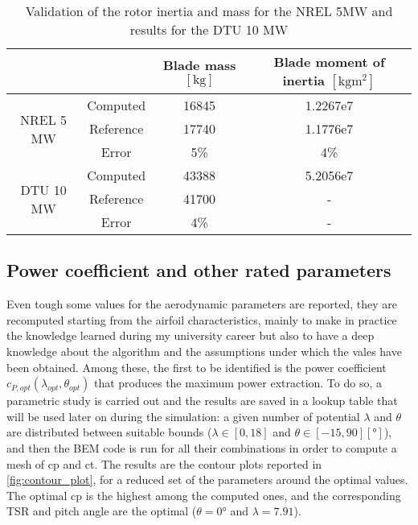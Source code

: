 \begin{table}[htb]
 \caption{Validation of the rotor inertia and mass for the NREL 5MW and results for the DTU 10 MW}
\centering
	\begin{tabular}{cccc}
		\toprule
    & & Blade mass $\left[\si{\kilo\gram}\right]$ & Blade moment of inertia $\left[\si{\kilo\gram\square\meter}\right]$\\ \midrule
    \multirow{3}{*}{NREL 5 MW}		     &  Computed 	& 16845	&  1.2267e7\\
      & Reference	\cite{NREL_5MW_reference} & 17740 &  1.1776e7\\ 
      & Error & 5\% &4\% \\ \midrule
    \multirow{3}{*}{DTU 10 MW}& Computed    &  43388 & 5.2056e7\\
& Reference \cite{review_of_scaling_low} & 41700 & -\\
& Error & 4\% & -  \\  
		\bottomrule
	\end{tabular}
 \label{tab:rotor_inertia}
\end{table}

\subsection{Power coefficient and other rated parameters}\label{subsec:lookup_cp}
Even tough some values for the aerodynamic parameters are reported, they are recomputed starting from the airfoil characteristics, mainly to make in practice the knowledge learned during my university career but also to have a deep knowledge about the algorithm and the assumptions under which the vales have been obtained. Among these, the first to be identified is the power coefficient $c_{P, opt}(\lambda_{opt}, \theta_{opt})$ that produces the maximum power extraction. To do so, a parametric study is carried out and the results are saved in a lookup table that will be used later on during the simulation: a given number of potential $\lambda$ and $\theta$ are distributed between suitable bounds ($\lambda \in \left[0, 18\right]$  and $\theta \in \left[-15, 90\right] \left[\si{\degree}\right]$), and then the \acrshort{BEM} code is run for all their combinations in order to compute a mesh of \acrshort{cp} and \acrshort{ct}. The results are the contour plots reported in \autoref{fig:contour_plot}, for a reduced set of the parameters around the optimal values. The optimal \acrlong{cp} is the highest among the computed ones, and the corresponding \acrshort{TSR} and pitch angle are the optimal ($\theta=0\si{\degree}$ and $\lambda=7.91$). 

